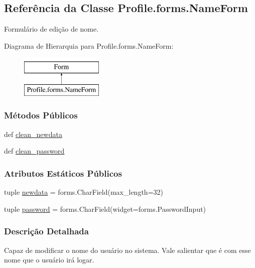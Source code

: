 \hypertarget{classProfile_1_1forms_1_1NameForm}{\subsection{Referência da Classe Profile.\-forms.\-Name\-Form}
\label{classProfile_1_1forms_1_1NameForm}
}


Formulário de edição de nome.  


Diagrama de Hierarquia para Profile.\-forms.\-Name\-Form\-:\begin{figure}[H]
\begin{center}
\leavevmode
\includegraphics[height=2.000000cm]{d6/d33/classProfile_1_1forms_1_1NameForm}
\end{center}
\end{figure}
\subsubsection*{Métodos Públicos}
\begin{DoxyCompactItemize}
\item 
def \hyperlink{classProfile_1_1forms_1_1NameForm_a4e324f8cfc90a67d56802f66ce48c4ca}{clean\-\_\-newdata}
\item 
def \hyperlink{classProfile_1_1forms_1_1NameForm_a681fa28036a241632b8688d436f04a49}{clean\-\_\-password}
\end{DoxyCompactItemize}
\subsubsection*{Atributos Estáticos Públicos}
\begin{DoxyCompactItemize}
\item 
tuple \hyperlink{classProfile_1_1forms_1_1NameForm_a6ebfb316b263c162dd3895b1da149eda}{newdata} = forms.\-Char\-Field(max\-\_\-length=32)
\item 
tuple \hyperlink{classProfile_1_1forms_1_1NameForm_a5a6959db0132c607a56f9cda75769ecf}{password} = forms.\-Char\-Field(widget=forms.\-Password\-Input)
\end{DoxyCompactItemize}


\subsubsection{Descrição Detalhada}
Capaz de modificar o nome do usuário no sistema. Vale salientar que é com esse nome que o usuário irá logar. 

